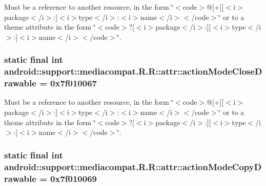 Must be a reference to another resource, in the form \char`\"{}$<$code$>$@\mbox{[}+\mbox{]}\mbox{[}$<$i$>$package$<$/i$>$:\mbox{]}$<$i$>$type$<$/i$>$:$<$i$>$name$<$/i$>$$<$/code$>$\char`\"{} or to a theme attribute in the form \char`\"{}$<$code$>$?\mbox{[}$<$i$>$package$<$/i$>$:\mbox{]}\mbox{[}$<$i$>$type$<$/i$>$:\mbox{]}$<$i$>$name$<$/i$>$$<$/code$>$\char`\"{}. \hypertarget{classandroid_1_1support_1_1mediacompat_1_1_r_1_1attr_2444eda83b6a8557d1e1cec772dad828}{
\subsubsection[{actionModeCloseDrawable}]{\setlength{\rightskip}{0pt plus 5cm}static final int android::support::mediacompat.R.R::attr::actionModeCloseDrawable = 0x7f010067}}
\label{classandroid_1_1support_1_1mediacompat_1_1_r_1_1attr_2444eda83b6a8557d1e1cec772dad828}


Must be a reference to another resource, in the form \char`\"{}$<$code$>$@\mbox{[}+\mbox{]}\mbox{[}$<$i$>$package$<$/i$>$:\mbox{]}$<$i$>$type$<$/i$>$:$<$i$>$name$<$/i$>$$<$/code$>$\char`\"{} or to a theme attribute in the form \char`\"{}$<$code$>$?\mbox{[}$<$i$>$package$<$/i$>$:\mbox{]}\mbox{[}$<$i$>$type$<$/i$>$:\mbox{]}$<$i$>$name$<$/i$>$$<$/code$>$\char`\"{}. \hypertarget{classandroid_1_1support_1_1mediacompat_1_1_r_1_1attr_2735514f0b9514597f20531f2fe3f5fa}{
\subsubsection[{actionModeCopyDrawable}]{\setlength{\rightskip}{0pt plus 5cm}static final int android::support::mediacompat.R.R::attr::actionModeCopyDrawable = 0x7f010069}}
\label{classandroid_1_1support_1_1mediacompat_1_1_r_1_1attr_2735514f0b9514597f20531f2fe3f5fa}


